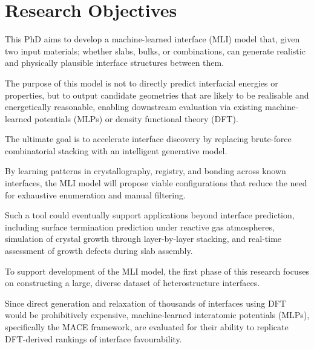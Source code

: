 \section{Research Objectives} \label{section:research_objectives}

\label{para:objectives_mli_goal} %

This PhD aims to develop a machine-learned interface (MLI) model that, given two input materials; whether slabs, bulks,
or combinations, can generate realistic and physically plausible interface structures between them\nocite{}.

The purpose of this model is not to directly predict interfacial energies or properties, but to output candidate
geometries that are likely to be realisable and energetically reasonable, enabling downstream evaluation via existing
machine-learned potentials (MLPs) or density functional theory (DFT)\nocite{}.

\label{para:objectives_mli_pipeline} %

The ultimate goal is to accelerate interface discovery by replacing brute-force combinatorial stacking with an
intelligent generative model\nocite{}.

By learning patterns in crystallography, registry, and bonding across known interfaces, the MLI model will propose
viable configurations that reduce the need for exhaustive enumeration and manual filtering\nocite{}.

\label{para:objectives_mli_extended_use} %

Such a tool could eventually support applications beyond interface prediction, including surface termination prediction
under reactive gas atmospheres, simulation of crystal growth through layer-by-layer stacking, and real-time assessment
of growth defects during slab assembly\nocite{}.

\label{para:objectives_dataset_building} %

To support development of the MLI model, the first phase of this research focuses on constructing a large, diverse
dataset of heterostructure interfaces\nocite{}.

Since direct generation and relaxation of thousands of interfaces using DFT would be prohibitively expensive,
machine-learned interatomic potentials (MLPs), specifically the MACE framework, are evaluated for their ability to
replicate DFT-derived rankings of interface favourability\cite{Batatia2022-xz}.

\label{para:objectives_screening_workflow} %

